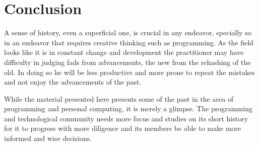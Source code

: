 \section{Conclusion}

A sense of history, even a superficial one, is crucial in any
endeavor, specially so in an endeavor that requires creative thinking
such as programming. As the field looks like it is in constant change
and development the practitioner may have difficulty in judging fads
from advancements, the new from the rehashing of the old. In doing so
he will be less productive and more prone to repeat the mistakes and
not enjoy the advancements of the past.

While the material presented here presents some of the past in the
area of programming and personal computing, it is merely a
glimpse. The programming and technological community needs more focus
and studies on its short history for it to progress with more
diligence and its members be able to make more informed and wise decisions.
